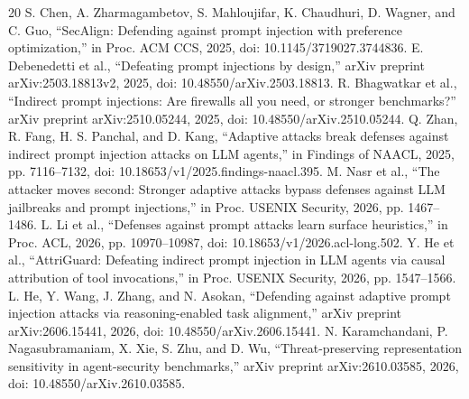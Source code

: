 \documentclass[conference]{IEEEtran}
\begin{document}
\begin{thebibliography}{20}
 S. Chen, A. Zharmagambetov, S. Mahloujifar, K. Chaudhuri, D. Wagner, and C. Guo, ``SecAlign: Defending against prompt injection with preference optimization,'' in Proc. ACM CCS, 2025, doi: 10.1145/3719027.3744836.
 E. Debenedetti et al., ``Defeating prompt injections by design,'' arXiv preprint arXiv:2503.18813v2, 2025, doi: 10.48550/arXiv.2503.18813.
 R. Bhagwatkar et al., ``Indirect prompt injections: Are firewalls all you need, or stronger benchmarks?'' arXiv preprint arXiv:2510.05244, 2025, doi: 10.48550/arXiv.2510.05244.
 Q. Zhan, R. Fang, H. S. Panchal, and D. Kang, ``Adaptive attacks break defenses against indirect prompt injection attacks on LLM agents,'' in Findings of NAACL, 2025, pp. 7116--7132, doi: 10.18653/v1/2025.findings-naacl.395.
 M. Nasr et al., ``The attacker moves second: Stronger adaptive attacks bypass defenses against LLM jailbreaks and prompt injections,'' in Proc. USENIX Security, 2026, pp. 1467--1486.
 L. Li et al., ``Defenses against prompt attacks learn surface heuristics,'' in Proc. ACL, 2026, pp. 10970--10987, doi: 10.18653/v1/2026.acl-long.502.
 Y. He et al., ``AttriGuard: Defeating indirect prompt injection in LLM agents via causal attribution of tool invocations,'' in Proc. USENIX Security, 2026, pp. 1547--1566.
 L. He, Y. Wang, J. Zhang, and N. Asokan, ``Defending against adaptive prompt injection attacks via reasoning-enabled task alignment,'' arXiv preprint arXiv:2606.15441, 2026, doi: 10.48550/arXiv.2606.15441.
 N. Karamchandani, P. Nagasubramaniam, X. Xie, S. Zhu, and D. Wu, ``Threat-preserving representation sensitivity in agent-security benchmarks,'' arXiv preprint arXiv:2610.03585, 2026, doi: 10.48550/arXiv.2610.03585.
\end{thebibliography}
\end{document}
